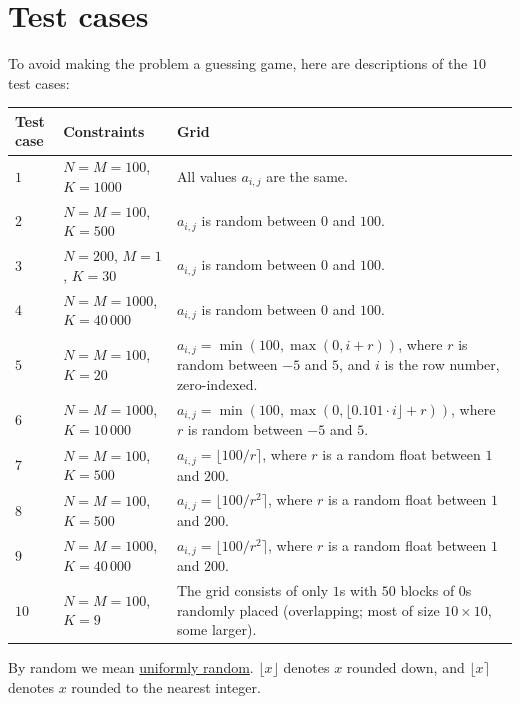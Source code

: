 \section*{Test cases}
To avoid making the problem a guessing game, here are descriptions of the $10$ test cases:
\noindent
\begin{tabular}{| l | l | l |}
\hline
Test case & Constraints                       & Grid \\ \hline
$1$       & $N = M = 100$, $K = 1000$     & All values $a_{i,j}$ are the same. \\ \hline
$2$       & $N = M = 100$, $K = 500$      & $a_{i,j}$ is random between $0$ and $100$. \\ \hline
$3$       & $N = 200$, $M = 1$, $K = 30$  & $a_{i,j}$ is random between $0$ and $100$. \\ \hline
$4$       & $N = M = 1000$, $K = 40\,000$ & $a_{i,j}$ is random between $0$ and $100$. \\ \hline
$5$       & $N = M = 100$, $K = 20$       & $a_{i,j} = \min(100, \max(0, i + r))$, where $r$ is random between $-5$ and $5$, and $i$ is the row number, zero-indexed. \\ \hline
$6$       & $N = M = 1000$, $K = 10\,000$ & $a_{i,j} = \min(100, \max(0, \lfloor 0.101 \cdot i \rfloor + r))$, where $r$ is random between $-5$ and $5$. \\ \hline
$7$       & $N = M = 100$, $K = 500$      & $a_{i,j} = \lfloor 100 / r \rceil$, where $r$ is a random float between $1$ and $200$. \\ \hline
$8$       & $N = M = 100$, $K = 500$      & $a_{i,j} = \lfloor 100 / r^2 \rceil$, where $r$ is a random float between $1$ and $200$. \\ \hline
$9$       & $N = M = 1000$, $K = 40\,000$ & $a_{i,j} = \lfloor 100 / r^2 \rceil$, where $r$ is a random float between $1$ and $200$. \\ \hline
$10$      & $N = M = 100$, $K = 9$        & The grid consists of only $1$s with $50$ blocks of $0$s randomly placed (overlapping; most of size $10 \times 10$, some larger). \\ \hline
\end{tabular}

By random we mean \href{https://en.wikipedia.org/wiki/Continuous_uniform_distribution}{uniformly random}. $\lfloor x \rfloor$ denotes $x$ rounded down, and $\lfloor x \rceil$ denotes $x$ rounded to the nearest integer.
